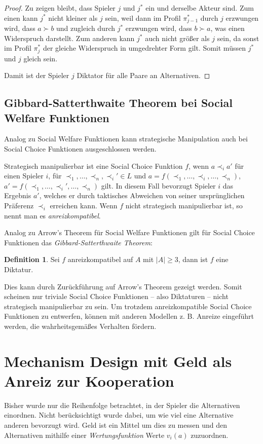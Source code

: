 \documentclass[a4paper,11pt]{article}
\theoremstyle{definition}
\newtheorem{definition}{Definition}
\theoremstyle{plain}
\theoremstyle{definition}
\begin{document}
\begin{proof}
	Zu zeigen bleibt, dass Spieler $j$ und $j^*$ ein und derselbe Akteur sind. 
	Zum einen kann $j^*$ nicht kleiner als $j$ sein, weil dann im Profil $\pi_{j-1}^*$ durch $j$ erzwungen wird, dass $a \succ b$ und zugleich durch $j^*$ erzwungen wird, dass $b \succ a$, was einen Widerspruch darstellt. 
	Zum anderen kann $j^*$ auch nicht größer als $j$ sein, da sonst im Profil $\pi_{j}^*$ der gleiche Widerspruch in umgedrehter Form gilt. Somit müssen $j^*$ und $j$ gleich sein.
	
	Damit ist der Spieler $j$ Diktator für alle Paare an Alternativen.
\end{proof}

\subsection{Gibbard-Satterthwaite Theorem bei Social Welfare Funktionen}
Analog zu Social Welfare Funktionen kann strategische Manipulation auch bei Social Choice Funktionen ausgeschlossen werden.

Strategisch manipulierbar ist eine Social Choice Funktion $f$, wenn $a \prec_i a'$ 
für einen Spieler $i$, für $\prec_1, \ldots, \prec_n, \prec_i' \in L$ und 
$a = f(\prec_1, \ldots, \prec_i, \ldots, \prec_n)$, 
$a' = f(\prec_1, \ldots, \prec_i', \ldots, \prec_n)$ gilt. 
In diesem Fall bevorzugt Spieler $i$ das Ergebnis $a'$, welches er durch taktisches Abweichen von seiner ursprünglichen Präferenz $\prec_i$ erreichen kann.
Wenn $f$ nicht strategisch manipulierbar ist, so nennt man es \emph{anreizkompatibel}.

Analog zu Arrow's Theorem für Social Welfare Funktionen gilt für Social Choice Funktionen das \emph{Gibbard-Satterthwaite Theorem}:

\begin{definition}
	\label{def:GibbSatt}
	Sei $f$ anreizkompatibel auf $A$ mit $|A| \geq 3$, dann ist $f$ eine Diktatur.
\end{definition}

Dies kann durch Zurückführung auf Arrow's Theorem gezeigt werden. Somit scheinen nur triviale Social Choice Funktionen -- also Diktaturen -- nicht strategisch manipulierbar zu sein. Um trotzdem anreizkompatible Social Choice Funktionen zu entwerfen, können mit anderen Modellen {z. B.} Anreize eingeführt werden, die wahrheitsgemäßes Verhalten fördern.

\section{Mechanism Design mit Geld als Anreiz zur Kooperation}
Bisher wurde nur die Reihenfolge betrachtet, in der Spieler die Alternativen einordnen. Nicht berücksichtigt wurde dabei, um wie viel eine Alternative anderen bevorzugt wird. Geld ist ein Mittel um dies zu messen und den Alternativen mithilfe einer \emph{Wertungsfunktion} Werte $v_i(a)$ zuzuordnen. 
\end{document}
